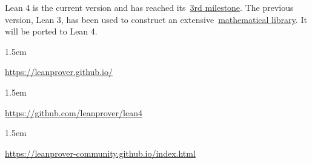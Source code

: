 \documentclass[12pt,twoside]{article}
\begin{document}
Lean 4 is the current version and has reached its~\href{https://github.com/leanprover/lean4/releases/tag/v4.0.0-m3}{3rd
milestone}.
The previous version, Lean 3, has been used to construct an
extensive~\href{https://leanprover-community.github.io/index.html}{mathematical
library}. It will be
ported to Lean 4.%

\begin{mddefinitions}%


\begin{mdbmarginx}{}{}{}{1.5em}%
\begin{mddefdata}%

\href{https://leanprover.github.io/}{{\ttfamily https://\hspace{0pt}leanprover.\hspace{0pt}github.\hspace{0pt}io/\hspace{0pt}}}%
\end{mddefdata}%
\end{mdbmarginx}%

\begin{mdbmarginx}{}{}{}{1.5em}%
\begin{mddefdata}%

\href{https://github.com/leanprover/lean4}{{\ttfamily https://\hspace{0pt}github.\hspace{0pt}com/\hspace{0pt}leanprover/\hspace{0pt}lean4}}%
\end{mddefdata}%
\end{mdbmarginx}%

\begin{mdbmarginx}{}{}{}{1.5em}%
\begin{mddefdata}%

\href{https://leanprover-community.github.io/index.html}{{\ttfamily https://\hspace{0pt}leanprover-\hspace{0pt}community.\hspace{0pt}github.\hspace{0pt}io/\hspace{0pt}index.\hspace{0pt}html}}%
\end{mddefdata}%
\end{mdbmarginx}%


\end{mddefinitions}
\end{document}

